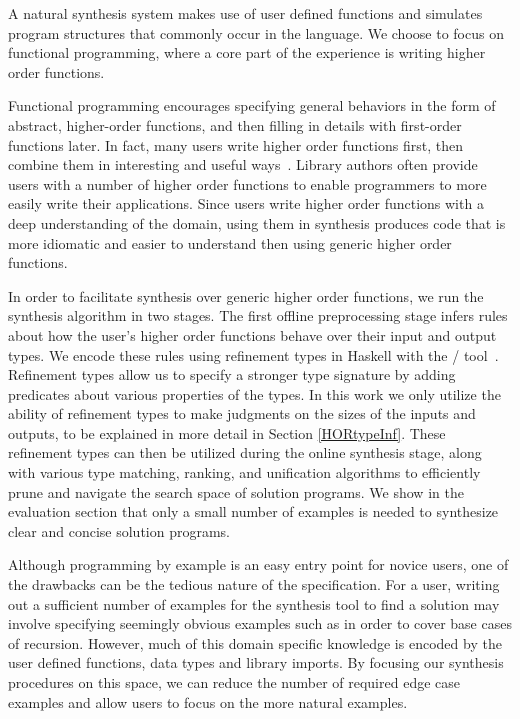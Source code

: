 A natural synthesis system makes use of user defined functions and simulates program structures that commonly occur in the language.
We choose to focus on functional programming, where a core part of the experience is writing higher order functions.

Functional programming encourages specifying general behaviors in the form of abstract, higher-order functions, and then filling in details with first-order functions later.
In fact, many users write higher order functions first, then combine them in interesting and useful ways~\cite{Lipovaca:2011}.
Library authors often provide users with a number of higher order functions to enable programmers to more easily write their applications.
Since users write higher order functions with a deep understanding of the domain, using them in synthesis produces code that is more idiomatic and easier to understand then using generic higher order functions.

In order to facilitate synthesis over generic higher order functions, we run the synthesis algorithm in two stages.
The first offline preprocessing stage infers rules about how the user's higher order functions behave over their input and output types.
We encode these rules using refinement types in Haskell with the \lhask/ tool~\cite{DBLP:conf/haskell/VazouSJ14}.
Refinement types allow us to specify a stronger type signature by adding predicates about various properties of the types.
In this work we only utilize the ability of refinement types to make judgments on the sizes of the inputs and outputs, to be explained in more detail in Section \ref{HORtypeInf}.
These refinement types can then be utilized during the online synthesis stage, along with various type matching, ranking, and unification algorithms to efficiently prune and navigate the search space of solution programs.
We show in the evaluation section that only a small number of examples is needed to synthesize clear and concise solution programs.

Although programming by example is an easy entry point for novice users, one of the drawbacks can be the tedious nature of the specification.
For a user, writing out a sufficient number of examples for the synthesis tool to find a solution may involve
  specifying seemingly obvious examples such as \codeinline{[]->[]} in order to cover base cases of recursion.
However, much of this domain specific knowledge is encoded by the user defined functions, data types and library imports. By focusing our synthesis procedures on this space, we can reduce the number of required edge case examples and allow users to focus on the more natural examples.

